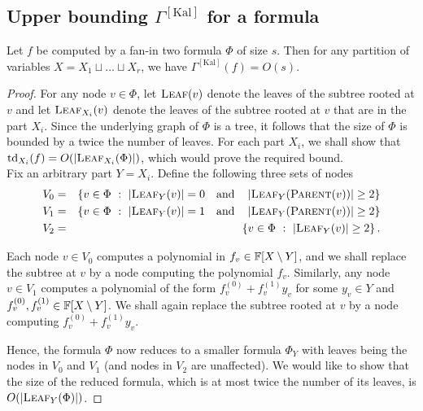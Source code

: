 \documentclass[12pt]{report}
\newcommand{\CM}[1]{\Gamma^{\mathrm{[#1]}}}
\begin{document}
\subsection{Upper bounding $\CM{Kal}$ for a formula}

\begin{lemma}\label{lem:kal-upperbound}
  Let $f$ be computed by a fan-in two formula $\Phi$ of size $s$. Then
  for any partition of variables $X = X_1\sqcup \dots \sqcup X_r$, we
  have $\CM{Kal}(f) = O(s)$.
\end{lemma}
\begin{proof}
  For any node $v\in \Phi$, let $\textsc{Leaf}(v)$ denote the leaves
  of the subtree rooted at $v$ and let $\textsc{Leaf}_{X_i}(v)$ denote
  the leaves of the subtree rooted at $v$ that are in the part
  $X_i$. Since the underlying graph of $\Phi$ is a tree, it follows
  that the size of $\Phi$ is bounded by a twice the number of
  leaves. For each part $X_i$, we shall show that
  $\mathrm{td}_{X_i}(f) = O(\left|\textsc{Leaf}_{X_i}(\Phi)\right|)$, which
  would prove the required bound. \\

  Fix an arbitrary part $Y = X_i$. Define the following three 
  sets of nodes
  \begin{eqnarray*}
    V_0 & = & \left\{{v\in \Phi}\ : \ {\left|\textsc{Leaf}_{Y}(v)\right| = 0 \quad\text{and}\quad \left|\textsc{Leaf}_{Y}(\textsc{Parent}(v))\right| \geq 2}\right\}\\
    V_1 & = & \left\{{v\in \Phi}\ : \ {\left|\textsc{Leaf}_{Y}(v)\right| = 1 \quad\text{and}\quad \left|\textsc{Leaf}_{Y}(\textsc{Parent}(v))\right| \geq 2}\right\}\\
    V_2 & = & \left\{{v\in \Phi}\ : \ {\left|\textsc{Leaf}_{Y}(v)\right| \geq 2}\right\}.
  \end{eqnarray*}

  Each node $v\in V_0$ computes a polynomial in $f_v \in
  \mathbb{F}[X\setminus Y]$, and we shall replace the subtree at $v$ by a node
  computing the polynomial $f_v$. Similarly, any node $v\in V_1$
  computes a polynomial of the form $f^{(0)}_v + f^{(1)}_v y_v$ for some $y_v\in Y$
  and $f^{(0)}_v, f^{(1)}_v \in \mathbb{F}[X\setminus Y]$. We shall again replace the
  subtree rooted at $v$ by a node computing $f^{(0)}_v + f^{(1)}_v y_v$. 

  Hence, the formula $\Phi$ now reduces to a smaller formula $\Phi_Y$ with
  leaves  being the nodes in $V_0$ and $V_1$ (and nodes in $V_2$ are
  unaffected). We would like to show that the size of the reduced
  formula, which is at most twice the number of its leaves, is
  $O(\left|\textsc{Leaf}_Y(\Phi)\right|)$.


\end{proof}
\end{document}
